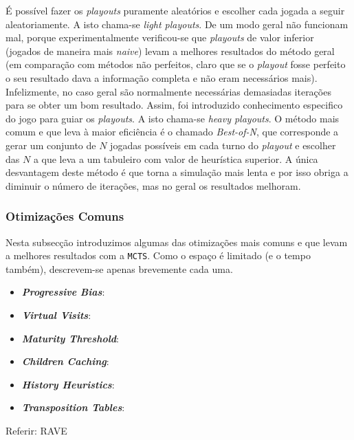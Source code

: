 \documentclass[12pt,a4paper,oneside]{article}
\begin{document}
É possível fazer os \textit{playouts} puramente aleatórios e escolher
cada jogada a seguir aleatoriamente. A isto chama-se \textit{light
  playouts}. De um modo geral não funcionam mal, porque
experimentalmente verificou-se que \textit{playouts} de valor inferior
(jogados de maneira mais \textit{naive}) levam a melhores resultados
do método geral (em comparação com métodos não perfeitos, claro que se
o \textit{playout} fosse perfeito o seu resultado dava a informação
completa e não eram necessários mais). Infelizmente, no caso geral são
normalmente necessárias demasiadas iterações para se obter um bom
resultado. Assim, foi introduzido conhecimento especifico do jogo para
guiar os \textit{playouts}. A isto chama-se \textit{heavy playouts}. O
método mais comum e que leva à maior eficiência é o chamado
\textit{Best-of-N}, que corresponde a gerar um conjunto de $N$ jogadas
possíveis em cada turno do \textit{playout} e escolher das $N$ a que
leva a um tabuleiro com valor de heurística superior. A única
desvantagem deste método é que torna a simulação mais lenta e por isso
obriga a diminuir o número de iterações, mas no geral os resultados
melhoram.

\subsubsection{Otimizações Comuns}
\label{sec:mcopt}


Nesta subsecção introduzimos algumas das otimizações mais comuns e que
levam a melhores resultados com a \texttt{MCTS}. Como o espaço é
limitado (e o tempo também), descrevem-se apenas brevemente cada uma.

\begin{itemize}
\item \textbf{\textit{Progressive Bias}}:
\item \textbf{\textit{Virtual Visits}}:
\item \textbf{\textit{Maturity Threshold}}:
\item \textbf{\textit{Children Caching}}:
\item \textbf{\textit{History Heuristics}}:
\item \textbf{\textit{Transposition Tables}}:
\end{itemize}

Referir: RAVE

\end{document}
